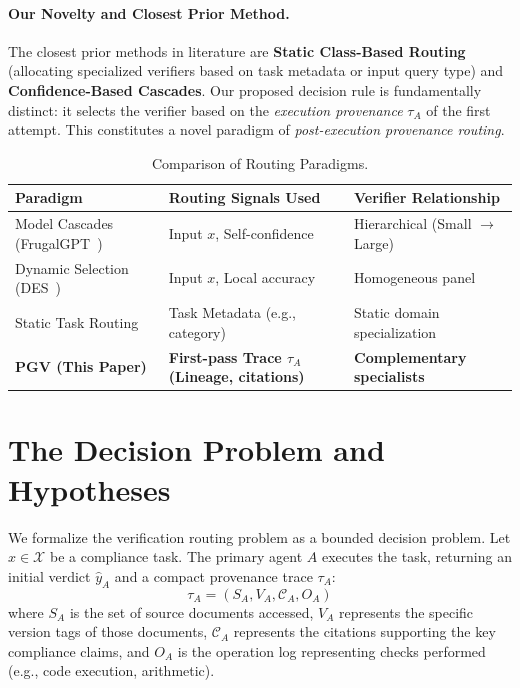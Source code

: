 \documentclass[manuscript,screen,nonacm]{acmart}
\begin{document}
\paragraph{Our Novelty and Closest Prior Method.}
The closest prior methods in literature are \textbf{Static Class-Based Routing} (allocating specialized verifiers based on task metadata or input query type) and \textbf{Confidence-Based Cascades}. Our proposed decision rule is fundamentally distinct: it selects the verifier based on the \emph{execution provenance} $\tau_A$ of the first attempt. This constitutes a novel paradigm of \emph{post-execution provenance routing}.

\begin{table}[h]
\caption{Comparison of Routing Paradigms.}
\label{tab:paradigms}
\small
\centering
\begin{tabular}{lll}
\toprule
Paradigm & Routing Signals Used & Verifier Relationship \\
\midrule
Model Cascades (FrugalGPT~\cite{chen2023frugalgpt}) & Input $x$, Self-confidence & Hierarchical (Small $\to$ Large) \\
Dynamic Selection (DES~\cite{cruz2018dynamic}) & Input $x$, Local accuracy & Homogeneous panel \\
Static Task Routing & Task Metadata (e.g., category) & Static domain specialization \\
\textbf{PGV (This Paper)} & \textbf{First-pass Trace $\tau_A$ (Lineage, citations)} & \textbf{Complementary specialists} \\
\bottomrule
\end{tabular}
\end{table}

\section{The Decision Problem and Hypotheses}
\label{sec:formal}

We formalize the verification routing problem as a bounded decision problem. Let $x \in \mathcal{X}$ be a compliance task. The primary agent $A$ executes the task, returning an initial verdict $\hat{y}_A$ and a compact provenance trace $\tau_A$:
\begin{equation}
    \tau_A = (S_A, V_A, \mathcal{C}_A, O_A)
\end{equation}
where $S_A$ is the set of source documents accessed, $V_A$ represents the specific version tags of those documents, $\mathcal{C}_A$ represents the citations supporting the key compliance claims, and $O_A$ is the operation log representing checks performed (e.g., code execution, arithmetic).
\end{document}
